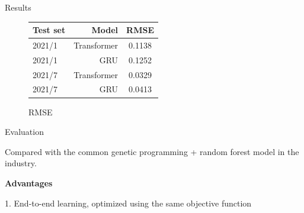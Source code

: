 \documentclass[final]{beamer}
\newlength{\colwidth}
\begin{document}
\begin{frame}[t]
\begin{columns}[t]
\begin{column}{\colwidth}
\begin{exampleblock}{Results}
\begin{figure}
\end{figure}
\begin{figure}[H]
\begin{minipage}{0.48\linewidth}
\end{minipage}
\hfill
\begin{minipage}{.48\linewidth}
\begin{table}
      \begin{tabular}{l r c}
        \toprule
        \textbf{Test set} & \textbf{Model} & \textbf{RMSE}\\
        \midrule
        2021/1 & Transformer & 0.1138 \\
        2021/1 & GRU & 0.1252 \\
        2021/7 & Transformer & 0.0329 \\
        2021/7 & GRU & 0.0413 \\
        \bottomrule
      \end{tabular}
    \end{table}
\end{minipage}
\caption{RMSE}
\end{figure}

  \end{exampleblock}

  \begin{block}{Evaluation}

    Compared with the common genetic programming + random forest model in the industry.
    
    \textbf{Advantages}
    
    1. End-to-end learning, optimized using the same objective function
    

\end{block}
\end{column}
\end{columns}
\end{frame}
\end{document}
